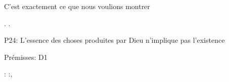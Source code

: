 \documentclass[10pt]{report}
\begin{document}
\begin{coqdoccode}
\coqdocindent{1.00em}
\coqdoceol
\coqdocindent{1.00em}
\begin{coqdoccomment}
\coqdocindent{0.50em}
C'est\coqdocindent{0.50em}
exactement\coqdocindent{0.50em}
ce\coqdocindent{0.50em}
que\coqdocindent{0.50em}
nous\coqdocindent{0.50em}
voulions\coqdocindent{0.50em}
montrer\coqdocindent{0.50em}
\end{coqdoccomment}
\coqdoceol
\coqdocindent{1.00em}
 .\coqdoceol
\coqdocnoindent
{}.\coqdoceol
\coqdocemptyline
\coqdocnoindent
\begin{coqdoccomment}
\coqdocindent{0.50em}
P24:\coqdocindent{0.50em}
L'essence\coqdocindent{0.50em}
des\coqdocindent{0.50em}
choses\coqdocindent{0.50em}
produites\coqdocindent{0.50em}
par\coqdocindent{0.50em}
Dieu\coqdocindent{0.50em}
n'implique\coqdocindent{0.50em}
pas\coqdocindent{0.50em}
l'existence\coqdocindent{0.50em}
\end{coqdoccomment}
\coqdoceol
\coqdocnoindent
\begin{coqdoccomment}
\coqdocindent{0.50em}
Prémisses:\coqdocindent{0.50em}
D1\coqdocindent{0.50em}
\end{coqdoccomment}
\coqdoceol
\coqdocnoindent
{}  : \coqdockw{\ensuremath{\forall}} :,\coqdoceol
\coqdocindent{1.00em}

\end{coqdoccode}
\end{document}
